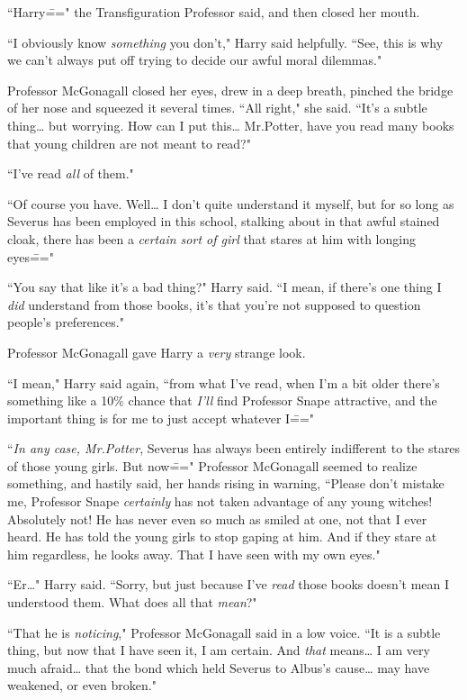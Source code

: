``Harry\===" the Transfiguration Professor said, and then closed her mouth.

``I obviously know \emph{something} you don't," Harry said helpfully. ``See, this is why we can't always put off trying to decide our awful moral dilemmas."

Professor McGonagall closed her eyes, drew in a deep breath, pinched the bridge of her nose and squeezed it several times. ``All right," she said. ``It's a subtle thing{\ldots} but worrying. How can I put this{\ldots} Mr.\?Potter, have you read many books that young children are not meant to read?"

``I've read \emph{all} of them."

``Of course you have. Well{\ldots} I don't quite understand it myself, but for so long as Severus has been employed in this school, stalking about in that awful stained cloak, there has been a \emph{certain sort of girl} that stares at him with longing eyes\==="

``You say that like it's a bad thing?" Harry said. ``I mean, if there's one thing I \emph{did} understand from those books, it's that you're not supposed to question people's preferences."

Professor McGonagall gave Harry a \emph{very} strange look.

``I mean," Harry said again, ``from what I've read, when I'm a bit older there's something like a 10\% chance that \emph{I'll} find Professor Snape attractive, and the important thing is for me to just accept whatever I\==="

``\emph{In any case, Mr.\?Potter}, Severus has always been entirely indifferent to the stares of those young girls. But now\===" Professor McGonagall seemed to realize something, and hastily said, her hands rising in warning, ``Please don't mistake me, Professor Snape \emph{certainly} has not taken advantage of any young witches! Absolutely not! He has never even so much as smiled at one, not that I ever heard. He has told the young girls to stop gaping at him. And if they stare at him regardless, he looks away. That I have seen with my own eyes."

``Er{\ldots}" Harry said. ``Sorry, but just because I've \emph{read} those books doesn't mean I understood them. What does all that \emph{mean}?"

``That he is \emph{noticing}," Professor McGonagall said in a low voice. ``It is a subtle thing, but now that I have seen it, I am certain. And \emph{that} means{\ldots} I am very much afraid{\ldots} that the bond which held Severus to Albus's cause{\ldots} may have weakened, or even broken."

